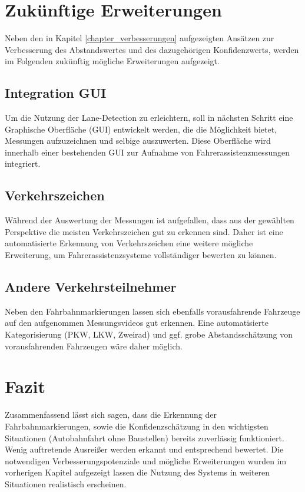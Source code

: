 \section{Zukünftige Erweiterungen}
    Neben den in Kapitel \ref{chapter_verbesserungen} aufgezeigten Ansätzen zur Verbesserung des Abstandswertes und des dazugehörigen Konfidenzwerts, werden im Folgenden zukünftig mögliche Erweiterungen aufgezeigt.

    \subsection{Integration GUI}
    Um die Nutzung der Lane-Detection zu erleichtern, soll in nächsten Schritt eine Graphische Oberfläche (GUI) entwickelt werden, die die Möglichkeit bietet, Messungen aufzuzeichnen und selbige auszuwerten. Diese Oberfläche wird innerhalb einer bestehenden GUI zur Aufnahme von Fahrerassistenzmessungen integriert.


    \subsection{Verkehrszeichen}
    Während der Auswertung der Messungen ist aufgefallen, dass aus der gewählten Perspektive die meisten Verkehrszeichen gut zu erkennen sind. Daher ist eine automatisierte Erkennung von Verkehrszeichen eine weitere mögliche Erweiterung, um Fahrerassistenzsysteme vollständiger bewerten zu können.

    \subsection{Andere Verkehrsteilnehmer}
    Neben den Fahrbahnmarkierungen lassen sich ebenfalls vorausfahrende Fahrzeuge auf den aufgenommen Messungsvideos gut erkennen. Eine automatisierte Kategorisierung (PKW, LKW, Zweirad) und ggf. grobe Abstandsschätzung von vorausfahrenden Fahrzeugen wäre daher möglich.

\section{Fazit}
Zusammenfassend lässt sich sagen, dass die Erkennung der Fahrbahnmarkierungen, sowie die Konfidenzschätzung in den wichtigsten Situationen (Autobahnfahrt ohne Baustellen) bereits zuverlässig funktioniert. Wenig auftretende Ausrei{\ss}er werden erkannt und entsprechend bewertet.
Die notwendigen Verbesserungspotenziale und mögliche Erweiterungen wurden im vorherigen Kapitel aufgezeigt lassen die Nutzung des Systems in weiteren Situationen realistisch erscheinen.